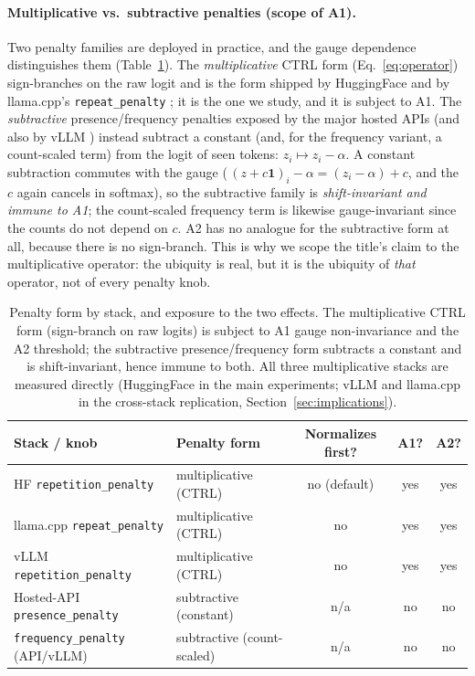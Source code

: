\documentclass[11pt]{article}
\newcommand{\code}[1]{\texttt{#1}}
\begin{document}
\paragraph{Multiplicative vs.\ subtractive penalties (scope of A1).} Two penalty families are
deployed in practice, and the gauge dependence distinguishes them (Table~\ref{tab:stacks}).
The \emph{multiplicative} CTRL form (Eq.~\eqref{eq:operator}) sign-branches on the raw logit and
is the form shipped by HuggingFace and by llama.cpp's \code{repeat\_penalty} \citep{llamacpp};
it is the one we study, and it is subject to A1. The \emph{subtractive} presence/frequency
penalties exposed by the major hosted APIs \citep{openai_api_penalties} (and also by vLLM
\citep{kwon2023vllm}) instead subtract a constant (and, for the frequency variant, a
count-scaled term) from the logit of seen tokens: $z_i \mapsto z_i - \alpha$. A
constant subtraction commutes with the gauge ($\,(z+c\mathbf{1})_i - \alpha = (z_i-\alpha)+c$,
and the $c$ again cancels in softmax), so the subtractive family is \emph{shift-invariant and
immune to A1}; the count-scaled frequency term is likewise gauge-invariant since the counts do
not depend on $c$. A2 has no analogue for the subtractive form at all, because there is no
sign-branch. This is why we scope the title's claim to the multiplicative operator: the
ubiquity is real, but it is the ubiquity of \emph{that} operator, not of every penalty knob.

\begin{table}[t]
\centering
\caption{Penalty form by stack, and exposure to the two effects. The multiplicative CTRL
form (sign-branch on raw logits) is subject to A1 gauge non-invariance and the A2 threshold;
the subtractive presence/frequency form subtracts a constant and is shift-invariant, hence
immune to both. All three multiplicative stacks are measured directly (HuggingFace in the main
experiments; vLLM and llama.cpp in the cross-stack replication, Section~\ref{sec:implications}).}
\label{tab:stacks}
\begin{tabular}{llccc}
\toprule
Stack / knob & Penalty form & Normalizes first? & A1? & A2? \\
\midrule
HF \code{repetition\_penalty}        & multiplicative (CTRL) & no (default) & yes & yes \\
llama.cpp \code{repeat\_penalty}     & multiplicative (CTRL) & no & yes & yes \\
vLLM \code{repetition\_penalty}      & multiplicative (CTRL) & no & yes & yes \\
Hosted-API \code{presence\_penalty}  & subtractive (constant) & n/a & no & no \\
\code{frequency\_penalty} (API/vLLM) & subtractive (count-scaled) & n/a & no & no \\
\bottomrule
\end{tabular}
\end{table}
\end{document}
